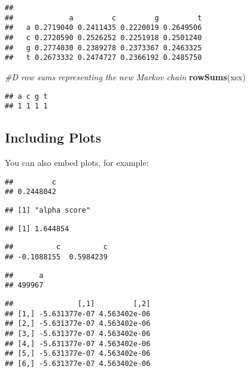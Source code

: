 \documentclass[
]{article}
\newenvironment{Shaded}{\begin{snugshade}}{\end{snugshade}}
\newcommand{\CommentTok}[1]{\textcolor[rgb]{0.56,0.35,0.01}{\textit{#1}}}
\newcommand{\KeywordTok}[1]{\textcolor[rgb]{0.13,0.29,0.53}{\textbf{#1}}}
\newcommand{\NormalTok}[1]{#1}
\begin{document}
\begin{verbatim}
##    
##             a         c         g         t
##   a 0.2719040 0.2411435 0.2220019 0.2649506
##   c 0.2720590 0.2526252 0.2251918 0.2501240
##   g 0.2774030 0.2389278 0.2373367 0.2463325
##   t 0.2673332 0.2474727 0.2366192 0.2485750
\end{verbatim}

\begin{Shaded}
\begin{Highlighting}[]
\CommentTok{#D row sums representing the new Markov chain}
\KeywordTok{rowSums}\NormalTok{(xsx)}
\end{Highlighting}
\end{Shaded}

\begin{verbatim}
## a c g t 
## 1 1 1 1
\end{verbatim}

\hypertarget{including-plots}{%
\subsection{Including Plots}\label{including-plots}}

You can also embed plots, for example:

\begin{verbatim}
##         c 
## 0.2448042
\end{verbatim}

\begin{verbatim}
## [1] "alpha score"
\end{verbatim}

\begin{verbatim}
## [1] 1.644854
\end{verbatim}

\begin{verbatim}
##          c          c 
## -0.1088155  0.5984239
\end{verbatim}

\begin{verbatim}
##      a 
## 499967
\end{verbatim}

\begin{verbatim}
##               [,1]         [,2]
## [1,] -5.631377e-07 4.563402e-06
## [2,] -5.631377e-07 4.563402e-06
## [3,] -5.631377e-07 4.563402e-06
## [4,] -5.631377e-07 4.563402e-06
## [5,] -5.631377e-07 4.563402e-06
## [6,] -5.631377e-07 4.563402e-06
\end{verbatim}
\end{document}
